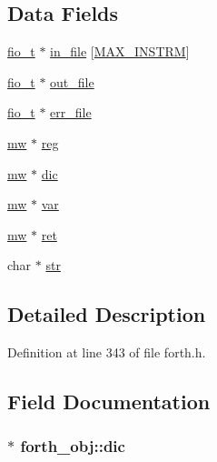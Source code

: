 \subsection*{Data Fields}
\begin{DoxyCompactItemize}
\item 
\hyperlink{forth_8h_a56e674ed4ad39d3d497ca51d35fc9861}{fio\-\_\-t} $\ast$ \hyperlink{structforth__obj_affea97aff17e933a7d4e97a1fb9bac3c}{in\-\_\-file} \mbox{[}\hyperlink{forth_8h_a29b3a2f9e308270f3d5e1634c7835678}{M\-A\-X\-\_\-\-I\-N\-S\-T\-R\-M}\mbox{]}
\item 
\hyperlink{forth_8h_a56e674ed4ad39d3d497ca51d35fc9861}{fio\-\_\-t} $\ast$ \hyperlink{structforth__obj_a4350825bc239e615e506b0e049bae2e2}{out\-\_\-file}
\item 
\hyperlink{forth_8h_a56e674ed4ad39d3d497ca51d35fc9861}{fio\-\_\-t} $\ast$ \hyperlink{structforth__obj_a46cd12633b331e5dd923a0bcab6b5e4a}{err\-\_\-file}
\item 
\hyperlink{forth_8h_aaec58f87481f4ec34b44a1db3e622ddc}{mw} $\ast$ \hyperlink{structforth__obj_aec82f9aa14ed1b88f71ca04ea1027dfa}{reg}
\item 
\hyperlink{forth_8h_aaec58f87481f4ec34b44a1db3e622ddc}{mw} $\ast$ \hyperlink{structforth__obj_a12eb705e425898a44f0f4ad087e48768}{dic}
\item 
\hyperlink{forth_8h_aaec58f87481f4ec34b44a1db3e622ddc}{mw} $\ast$ \hyperlink{structforth__obj_a7e44fb7a44a10b0acbfdce4c919db914}{var}
\item 
\hyperlink{forth_8h_aaec58f87481f4ec34b44a1db3e622ddc}{mw} $\ast$ \hyperlink{structforth__obj_a3fbef0ce707c544c528376b2c9788dbc}{ret}
\item 
char $\ast$ \hyperlink{structforth__obj_a7214c1e818fea38be42080ddf2d3406f}{str}
\end{DoxyCompactItemize}


\subsection{Detailed Description}


Definition at line 343 of file forth.\-h.



\subsection{Field Documentation}
\hypertarget{structforth__obj_a12eb705e425898a44f0f4ad087e48768}{
\subsubsection[{dic}]{$\ast$ forth\-\_\-obj\-::dic}}\label{structforth__obj_a12eb705e425898a44f0f4ad087e48768}


